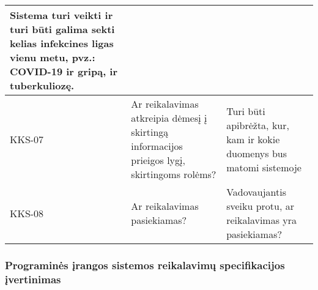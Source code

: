 \documentclass{VUMIFPSkursinis}
\begin{document}
\begin{center}
\begin{longtable}{|C{2cm}|L{5cm}|L{8cm}|}
		Sistema turi veikti ir turi būti galima sekti kelias infekcines ligas vienu metu, pvz.: COVID-19 ir gripą, ir tuberkuliozę.
		\\ \hline
		KKS-07                                                                                       &
		Ar reikalavimas atkreipia dėmesį į skirtingą informacijos prieigos lygį, skirtingoms rolėms? &
		Turi būti apibrėžta, kur, kam ir kokie duomenys bus matomi sistemoje
		\\ \hline
		KKS-08                                                                                       &
		Ar reikalavimas pasiekiamas?                                                                 &
		Vadovaujantis sveiku protu, ar reikalavimas yra pasiekiamas?
		\\ \hline
	\end{longtable}
\end{center}


\subsubsection{Programinės įrangos sistemos reikalavimų specifikacijos įvertinimas}
\end{document}
